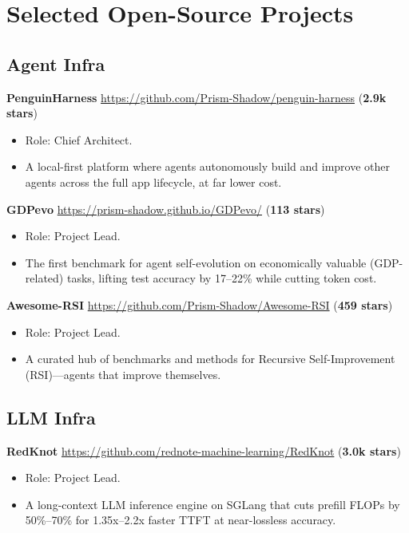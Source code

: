 \section{Selected Open-Source Projects}

\subsection{Agent Infra}
\begin{enumerate}[label={[\arabic*]}]
\item \textbf{PenguinHarness}
\url{https://github.com/Prism-Shadow/penguin-harness} (\textbf{2.9k stars})
\begin{itemize}
\item Role: Chief Architect.
\item A local-first platform where agents autonomously build and improve other agents across the full app lifecycle, at far lower cost.
\end{itemize}

\item \textbf{GDPevo}
\url{https://prism-shadow.github.io/GDPevo/} (\textbf{113 stars})
\begin{itemize}
\item Role: Project Lead.
\item The first benchmark for agent self-evolution on economically valuable (GDP-related) tasks, lifting test accuracy by 17--22\% while cutting token cost.
\end{itemize}

\item \textbf{Awesome-RSI}
\url{https://github.com/Prism-Shadow/Awesome-RSI} (\textbf{459 stars})
\begin{itemize}
\item Role: Project Lead.
\item A curated hub of benchmarks and methods for Recursive Self-Improvement (RSI)---agents that improve themselves.
\end{itemize}
\end{enumerate}

\subsection{LLM Infra}
\begin{enumerate}[label={[\arabic*]}]
\item \textbf{RedKnot}
\url{https://github.com/rednote-machine-learning/RedKnot} (\textbf{3.0k stars})
\begin{itemize}
\item Role: Project Lead.
\item A long-context LLM inference engine on SGLang that cuts prefill FLOPs by 50\%--70\% for 1.35x--2.2x faster TTFT at near-lossless accuracy.
\end{itemize}
\end{enumerate}
